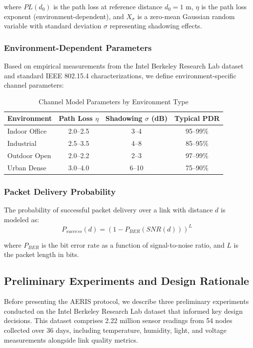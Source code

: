 where $PL(d_0)$ is the path loss at reference distance $d_0 = 1$ m,
$\eta$ is the path loss exponent (environment-dependent), and $X_\sigma$
is a zero-mean Gaussian random variable with standard deviation $\sigma$
representing shadowing effects.

\subsubsection{Environment-Dependent Parameters}

Based on empirical measurements from the Intel Berkeley Research Lab
dataset \cite{madden2004intel} and standard IEEE 802.15.4 characterizations,
we define environment-specific channel parameters:

\begin{table}[htbp]
\centering
\caption{Channel Model Parameters by Environment Type}
\label{tab:channel_params}
\begin{tabular}{@{}lccc@{}}
\toprule
Environment & Path Loss $\eta$ & Shadowing $\sigma$ (dB) & Typical PDR \\
\midrule
Indoor Office & 2.0--2.5 & 3--4 & 95--99\% \\
Industrial & 2.5--3.5 & 4--8 & 85--95\% \\
Outdoor Open & 2.0--2.2 & 2--3 & 97--99\% \\
Urban Dense & 3.0--4.0 & 6--10 & 75--90\% \\
\bottomrule
\end{tabular}
\end{table}

\subsubsection{Packet Delivery Probability}

The probability of successful packet delivery over a link with distance
$d$ is modeled as:
\begin{equation}
P_{success}(d) = \left(1 - P_{BER}(SNR(d))\right)^L
\label{eq:pdr}
\end{equation}

where $P_{BER}$ is the bit error rate as a function of signal-to-noise
ratio, and $L$ is the packet length in bits.

\subsection{Preliminary Experiments and Design Rationale}

Before presenting the AERIS protocol, we describe three preliminary
experiments conducted on the Intel Berkeley Research Lab dataset that
informed key design decisions. This dataset comprises 2.22 million sensor
readings from 54 nodes collected over 36 days, including temperature,
humidity, light, and voltage measurements alongside link quality metrics.

